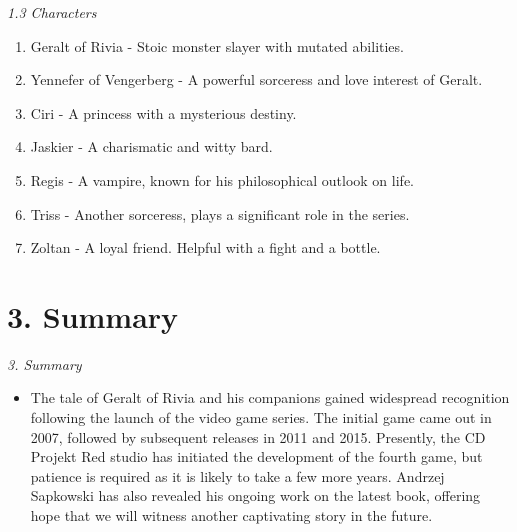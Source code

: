 \documentclass[xcolor=dvipsnames]{beamer}
\begin{document}
\begin{frame}{\textit{1.3 Characters}}

 \begin{enumerate}
      \item Geralt of Rivia - Stoic monster slayer with mutated abilities. \\
      \item Yennefer of Vengerberg - A powerful sorceress and love interest of Geralt. \\
      \item Ciri - A princess with a mysterious destiny. \\
      \item Jaskier - A charismatic and witty bard. \\
      \item Regis - A vampire, known for his philosophical outlook on life. \\
      \item Triss - Another sorceress, plays a significant role in the series. \\
      \item Zoltan - A loyal friend. Helpful with a fight and a bottle. \\
    \end{enumerate}
    
\end{frame}

\section{3. Summary}
\begin{frame}{\textit{3. Summary}}

 \begin{itemize}
    \item The tale of Geralt of Rivia and his companions gained widespread recognition following the launch of the video game series. The initial game came out in 2007, followed by subsequent releases in 2011 and 2015. Presently, the CD Projekt Red studio has initiated the development of the fourth game, but patience is required as it is likely to take a few more years. Andrzej Sapkowski has also revealed his ongoing work on the latest book, offering hope that we will witness another captivating story in the future.
    \end{itemize}
    
\end{frame}
\end{document}
